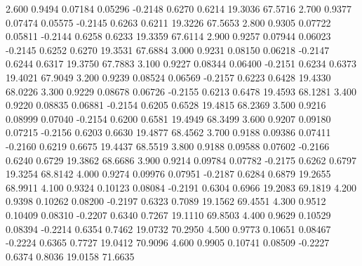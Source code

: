   2.600   0.9494   0.07184   0.05296  -0.2148   0.6270   0.6214  19.3036  67.5716
   2.700   0.9377   0.07474   0.05575  -0.2145   0.6263   0.6211  19.3226  67.5653
   2.800   0.9305   0.07722   0.05811  -0.2144   0.6258   0.6233  19.3359  67.6114
   2.900   0.9257   0.07944   0.06023  -0.2145   0.6252   0.6270  19.3531  67.6884
   3.000   0.9231   0.08150   0.06218  -0.2147   0.6244   0.6317  19.3750  67.7883
   3.100   0.9227   0.08344   0.06400  -0.2151   0.6234   0.6373  19.4021  67.9049
   3.200   0.9239   0.08524   0.06569  -0.2157   0.6223   0.6428  19.4330  68.0226
   3.300   0.9229   0.08678   0.06726  -0.2155   0.6213   0.6478  19.4593  68.1281
   3.400   0.9220   0.08835   0.06881  -0.2154   0.6205   0.6528  19.4815  68.2369
   3.500   0.9216   0.08999   0.07040  -0.2154   0.6200   0.6581  19.4949  68.3499
   3.600   0.9207   0.09180   0.07215  -0.2156   0.6203   0.6630  19.4877  68.4562
   3.700   0.9188   0.09386   0.07411  -0.2160   0.6219   0.6675  19.4437  68.5519
   3.800   0.9188   0.09588   0.07602  -0.2166   0.6240   0.6729  19.3862  68.6686
   3.900   0.9214   0.09784   0.07782  -0.2175   0.6262   0.6797  19.3254  68.8142
   4.000   0.9274   0.09976   0.07951  -0.2187   0.6284   0.6879  19.2655  68.9911
   4.100   0.9324   0.10123   0.08084  -0.2191   0.6304   0.6966  19.2083  69.1819
   4.200   0.9398   0.10262   0.08200  -0.2197   0.6323   0.7089  19.1562  69.4551
   4.300   0.9512   0.10409   0.08310  -0.2207   0.6340   0.7267  19.1110  69.8503
   4.400   0.9629   0.10529   0.08394  -0.2214   0.6354   0.7462  19.0732  70.2950
   4.500   0.9773   0.10651   0.08467  -0.2224   0.6365   0.7727  19.0412  70.9096
   4.600   0.9905   0.10741   0.08509  -0.2227   0.6374   0.8036  19.0158  71.6635
